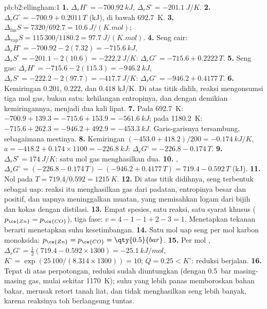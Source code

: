 \begin{solution}{pb:b2:ellingham:1}
\textbf{1.} $\Delta_r H^\circ = \qty{-700.92}{kJ}$, $\Delta_r S^\circ =
\qty{-201.1}{J/K}$.
\textbf{2.} $\Delta_r G^\circ = -700.9 + 0.2011\,T$ (\unit{kJ}), di bawah
\qty{692.7}{K}.
\textbf{3.} $\Delta_{\text{fus}}S = 7320/692.7 = \qty{10.6}{J/(K.mol)}$;
$\Delta_{\text{vap}}S = 115\,300/1180.2 = \qty{97.7}{J/(K.mol)}$.
\textbf{4.} Seng cair: $\Delta_r H^\circ = -700.92 - 2(7.32) = \qty{-715.6}{kJ}$,
$\Delta_r S^\circ = -201.1 - 2(10.6) = \qty{-222.2}{J/K}$: $\Delta_r G^\circ =
-715.6 + 0.2222\,T$.
\textbf{5.} Seng gas: $\Delta_r H^\circ = -715.6 - 2(115.3) = \qty{-946.2}{kJ}$,
$\Delta_r S^\circ = -222.2 - 2(97.7) = \qty{-417.7}{J/K}$: $\Delta_r G^\circ =
-946.2 + 0.4177\,T$.
\textbf{6.} Kemiringan $0.201$, $0.222$, dan $0.418$ \unit{kJ/K}. Di atas
titik didih, reaksi mengonsumsi tiga mol gas, bukan satu: kehilangan
entropinya, dan dengan demikian kemiringannya, menjadi dua kali lipat.
\textbf{7.} Pada \qty{692.7}{K}: $-700.9 + 139.3 = -715.6 + 153.9 = \qty{-561.6}{kJ}$;
pada \qty{1180.2}{K}: $-715.6 + 262.3 = -946.2 + 492.9 = \qty{-453.3}{kJ}$.
Garis-garisnya tersambung, sebagaimana mestinya.
\textbf{8.} Kemiringan $(-453.0 + 418.2)/200 = \qty{-0.174}{kJ/K}$, $a = -418.2 +
0.174 \times 1100 = \qty{-226.8}{kJ}$: $\Delta_r G^\circ = -226.8 - 0.174\,T$.
\textbf{9.} $\Delta_r S^\circ = \qty{+174}{J/K}$: satu mol gas menghasilkan
dua.
\textbf{10.} , $\Delta_r G^\circ = (-226.8 - 0.174\,T)
- (-946.2 + 0.4177\,T) = 719.4 - 0.592\,T$ (\unit{kJ}).
\textbf{11.} Nol pada $T = 719.4/0.592 = \qty{1215}{K}$.
\textbf{12.} Di atas titik didihnya, seng terbentuk sebagai uap: reaksi itu
menghasilkan gas dari padatan, entropinya besar dan positif, dan uapnya
meninggalkan muatan, yang memisahkan logam dari bijih dan kokas dengan
distilasi.
\textbf{13.} Empat spesies, satu reaksi, satu syarat khusus
($p_{\ce{Zn}} =
p_{\ce{CO}}$), tiga fase: $v = 4 - 1 - 1 + 2 - 3 = 1$.
Menetapkan tekanan berarti menetapkan suhu kesetimbangan.
\textbf{14.} Satu mol uap seng per mol karbon monoksida:
$p_{\ce{Zn}} = p_{\ce{CO}} = \qty{0.5}{bar}$.
\textbf{15.} Per mol , $\Delta_r G^\circ = \frac12(719.4 - 0.592 \times
1300) = \qty{-25.1}{kJ/mol}$, $K^\circ = \exp(25\,100/(8.314 \times 1300)) = 10$;
$Q = 0.25 < K^\circ$: reduksi berjalan.
\textbf{16.} Tepat di atas perpotongan, reduksi sudah diuntungkan (dengan
\qty{0.5}{bar} masing-masing gas, mulai sekitar \qty{1170}{K}); suhu yang
lebih panas memboroskan bahan bakar, merusak retort tanah liat, dan tidak
menghasilkan seng lebih banyak, karena reaksinya toh berlangsung tuntas.

\end{solution}
